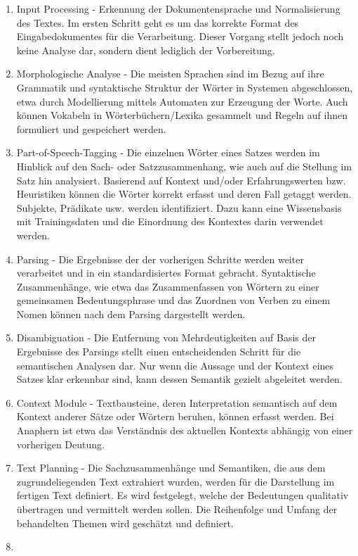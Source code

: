 \documentclass[12pt]{report}
\begin{document}
\begin{enumerate}
\item
Input Processing - Erkennung der Dokumentensprache und Normalisierung des Textes. Im ersten Schritt geht es um das korrekte Format des Eingabedokumentes für die Verarbeitung. Dieser Vorgang stellt jedoch noch keine Analyse dar, sondern dient lediglich der Vorbereitung.
\item
Morphologische Analyse - Die meisten Sprachen sind im Bezug auf ihre Grammatik und syntaktische Struktur der Wörter in Systemen abgeschlossen, etwa durch Modellierung mittels Automaten zur Erzeugung der Worte. Auch können Vokabeln in Wörterbüchern/Lexika gesammelt und Regeln auf ihnen formuliert und gespeichert werden.
\item
Part-of-Speech-Tagging - Die einzelnen Wörter eines Satzes werden im Hinblick auf den Sach- oder Satzzusammenhang, wie auch auf die Stellung im Satz hin analysiert. Basierend auf Kontext und/oder Erfahrungswerten bzw. Heuristiken können die Wörter korrekt erfasst und deren Fall getaggt werden. Subjekte, Prädikate usw. werden identifiziert. Dazu kann eine Wissensbasis mit Trainingsdaten und die Einordnung des Kontextes darin verwendet werden.
\item
Parsing - Die Ergebnisse der  der vorherigen Schritte werden weiter verarbeitet und in ein standardisiertes Format gebracht. Syntaktische Zusammenhänge, wie etwa das Zusammenfassen von Wörtern zu einer gemeinsamen Bedeutungsphrase und das Zuordnen von Verben zu einem Nomen können nach dem Parsing dargestellt werden.
\item
Disambiguation - Die Entfernung von Mehrdeutigkeiten auf Basis der Ergebnisse des Parsings stellt einen entscheidenden Schritt für die semantischen Analysen dar. Nur wenn die Aussage und der Kontext eines Satzes klar erkennbar sind, kann dessen Semantik gezielt abgeleitet werden.
\item
Context Module - Textbausteine, deren Interpretation semantisch auf dem Kontext anderer Sätze oder Wörtern beruhen, können erfasst werden. Bei Anaphern ist etwa das Verständnis des aktuellen Kontexts abhängig von einer vorherigen Deutung.
\item
Text Planning - Die Sachzusammenhänge und Semantiken, die aus dem zugrundeliegenden Text extrahiert wurden, werden für die Darstellung im fertigen Text definiert. Es wird festgelegt, welche der Bedeutungen qualitativ übertragen und vermittelt werden sollen. Die Reihenfolge und Umfang der behandelten Themen wird geschätzt und definiert.
\item

\end{enumerate}
\end{document}
